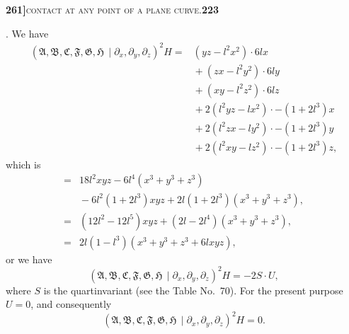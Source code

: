 \documentclass[11pt]{article}
\newcommand{\Cdel}{\mid}
\begin{document}
\newpage

\noindent\textbf{261]}\hfill\textsc{contact at any point of a plane curve.}\hfill\textbf{223}

\medskip

. We have
\[
\begin{aligned}
(\mathfrak{A}, \mathfrak{B}, \mathfrak{C}, \mathfrak{F}, \mathfrak{G}, \mathfrak{H}\,\Cdel\partial_x, \partial_y, \partial_z)^2 H
={}& (yz - l^2 x^2)\cdot 6lx\\
&{}+ (zx - l^2 y^2)\cdot 6ly\\
&{}+ (xy - l^2 z^2)\cdot 6lz\\
&{}+ 2(l^2 yz - lx^2)\cdot -(1 + 2l^3)x\\
&{}+ 2(l^2 zx - ly^2)\cdot -(1 + 2l^3)y\\
&{}+ 2(l^2 xy - lz^2)\cdot -(1 + 2l^3)z,
\end{aligned}
\]
which is
\[
\begin{aligned}
={}& 18l^2 xyz - 6l^4(x^3 + y^3 + z^3)\\
&{}- 6l^2(1 + 2l^3)xyz + 2l(1 + 2l^3)(x^3 + y^3 + z^3),\\
={}& (12l^2 - 12l^5)xyz + (2l - 2l^4)(x^3 + y^3 + z^3),\\
={}& 2l(1 - l^3)(x^3 + y^3 + z^3 + 6lxyz),
\end{aligned}
\]
or we have
\[
(\mathfrak{A}, \mathfrak{B}, \mathfrak{C}, \mathfrak{F}, \mathfrak{G}, \mathfrak{H}\,\Cdel\partial_x, \partial_y, \partial_z)^2 H = -2S \cdot U,
\]
where $S$ is the quartinvariant (see the Table No.~70). For the present purpose $U = 0$, and consequently
\[
(\mathfrak{A}, \mathfrak{B}, \mathfrak{C}, \mathfrak{F}, \mathfrak{G}, \mathfrak{H}\,\Cdel\partial_x, \partial_y, \partial_z)^2 H = 0.
\]

\medskip
\end{document}
